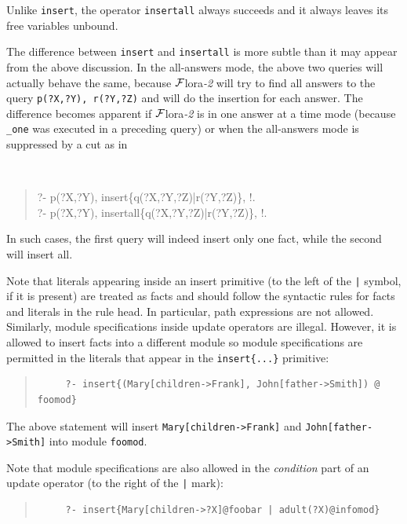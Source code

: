 \documentclass[11pt]{article}
\newcommand{\FLORA}{{\mbox{\sc ${\cal F}${lora}\rm\emph{-2}}}\xspace}
\begin{document}
Unlike {\tt insert}, the operator {\tt insertall} always succeeds and it
always leaves its free variables unbound.

The difference between {\tt insert} and {\tt insertall} is more subtle than
it may appear from the above discussion. In the all-answers mode, the above
two queries will actually behave the same, because \FLORA will try to find
all answers to the query {\tt p(?X,?Y), r(?Y,?Z)} and will do the 
insertion for each answer. The difference becomes apparent if \FLORA is in
one answer at a time mode (because {\tt \_one} was executed in a preceding
query) or when the all-answers mode is suppressed by a cut as in
{\tt
\begin{quote}
       ?- p(?X,?Y), insert\{q(?X,?Y,?Z)|r(?Y,?Z)\}, !.\\ 
       ?- p(?X,?Y), insertall\{q(?X,?Y,?Z)|r(?Y,?Z)\}, !.
\end{quote}
}
\noindent
In such cases, the first query will indeed insert only one fact, while the
second will insert all.

Note that literals appearing inside an insert primitive (to the left of the
\verb'|' symbol, if it is present) are treated as
facts and should follow the syntactic rules for facts and literals in the
rule head. In particular, path expressions are not allowed.
Similarly, module specifications inside update operators are illegal.
However, it is allowed to insert facts into a different module so module
specifications are permitted in the literals that appear in the 
{\tt insert\{...\}} primitive:
\begin{quote}
\begin{verbatim}
     ?- insert{(Mary[children->Frank], John[father->Smith]) @ foomod}
\end{verbatim}
\end{quote}
The above statement will insert {\tt Mary[children->Frank]} and
{\tt John[father->Smith]} into module {\tt foomod}.

Note that module specifications are also allowed in the
\emph{condition} part of an update operator (to the right of the \verb'|'
mark):
\begin{quote}
\begin{verbatim}
     ?- insert{Mary[children->?X]@foobar | adult(?X)@infomod}
\end{verbatim}
\end{quote}
\end{document}
